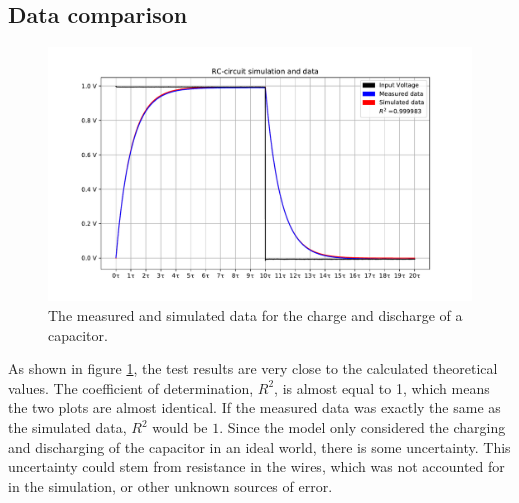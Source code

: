 \subsection{Data comparison}
\begin{figure}[H]
\center
\includegraphics[scale=0.6]{fig/img/eks_1}
\caption{The measured and simulated data for the charge and discharge of a capacitor.}
\label{fig:Cap}
\end{figure}
\noindent
As shown in figure \ref{fig:Cap}, the test results are very close to the calculated theoretical values. The coefficient of determination, $R^2$, is almost equal to 1, which means the two plots are almost identical. If the measured data was exactly the same as the simulated data, $R^2$ would be $1$. Since the model only considered the charging and discharging of the capacitor in an ideal world, there is some uncertainty. This uncertainty could stem from resistance in the wires, which was not accounted for in the simulation, or other unknown sources of error.